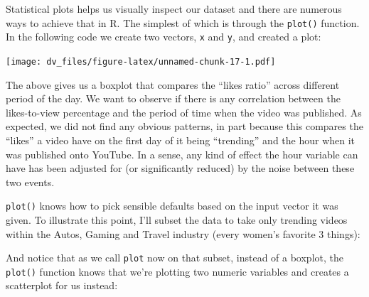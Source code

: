 \documentclass[]{article}
\newenvironment{Shaded}{\begin{snugshade}}{\end{snugshade}}
\newcommand{\KeywordTok}[1]{\textcolor[rgb]{0.13,0.29,0.53}{\textbf{#1}}}
\newcommand{\NormalTok}[1]{#1}
\newcommand{\OperatorTok}[1]{\textcolor[rgb]{0.81,0.36,0.00}{\textbf{#1}}}
\newcommand{\StringTok}[1]{\textcolor[rgb]{0.31,0.60,0.02}{#1}}
\begin{document}
Statistical plots helps us visually inspect our dataset and there are
numerous ways to achieve that in R. The simplest of which is through the
\texttt{plot()} function. In the following code we create two vectors,
\texttt{x} and \texttt{y}, and created a plot:

\begin{Shaded}
\end{Shaded}

\texttt{[image: dv\_files/figure-latex/unnamed-chunk-17-1.pdf]}

The above gives us a boxplot that compares the ``likes ratio'' across
different period of the day. We want to observe if there is any
correlation between the likes-to-view percentage and the period of time
when the video was published. As expected, we did not find any obvious
patterns, in part because this compares the ``likes'' a video have on
the first day of it being ``trending'' and the hour when it was
published onto YouTube. In a sense, any kind of effect the hour variable
can have has been adjusted for (or significantly reduced) by the noise
between these two events.

\texttt{plot()} knows how to pick sensible defaults based on the input
vector it was given. To illustrate this point, I'll subset the data to
take only trending videos within the Autos, Gaming and Travel industry
(every women's favorite 3 things):

\begin{Shaded}
\end{Shaded}

And notice that as we call \texttt{plot} now on that subset, instead of
a boxplot, the \texttt{plot()} function knows that we're plotting two
numeric variables and creates a scatterplot for us instead:
\end{document}
